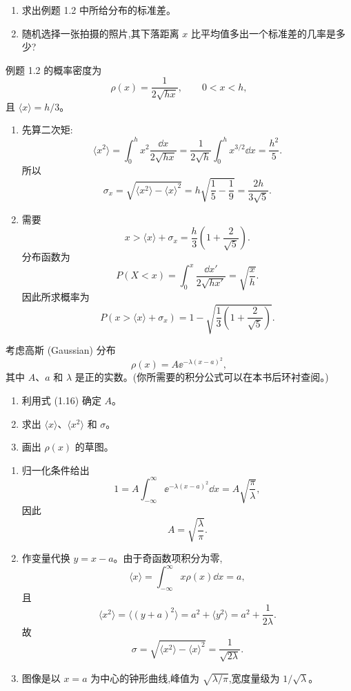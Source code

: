 \begin{question}
\begin{enumerate}
\item 求出例题 1.2 中所给分布的标准差。
\item 随机选择一张拍摄的照片,其下落距离 $x$ 比平均值多出一个标准差的几率是多少?
\end{enumerate}
\end{question}
\begin{solution}
例题 1.2 的概率密度为
\[
\rho(x)=\frac{1}{2\sqrt{hx}},\qquad 0<x<h,
\]
且 $\langle x\rangle=h/3$。
\begin{enumerate}
\item 先算二次矩:
\[
\langle x^2\rangle=\int_0^h x^2\frac{\dd x}{2\sqrt{hx}}
=\frac{1}{2\sqrt h}\int_0^h x^{3/2}\dd x
=\frac{h^2}{5}.
\]
所以
\[
\sigma_x=\sqrt{\langle x^2\rangle-\langle x\rangle^2}
=h\sqrt{\frac15-\frac19}=\frac{2h}{3\sqrt5}.
\]
\item 需要
\[
x>\langle x\rangle+\sigma_x=\frac{h}{3}\left(1+\frac{2}{\sqrt5}\right).
\]
分布函数为
\[
P(X<x)=\int_0^x \frac{\dd x'}{2\sqrt{hx'}}=\sqrt{\frac{x}{h}}.
\]
因此所求概率为
\[
P\left(x>\langle x\rangle+\sigma_x\right)
=1-\sqrt{\frac13\left(1+\frac{2}{\sqrt5}\right)}.
\]
\end{enumerate}
\end{solution}

\begin{question}
考虑高斯 (Gaussian) 分布
\[
\rho(x)=A \ee^{-\lambda (x-a)^2},
\]
其中 $A$、$a$ 和 $\lambda$ 是正的实数。(你所需要的积分公式可以在本书后环衬查阅。)
\begin{enumerate}
\item 利用式 (1.16) 确定 $A$。
\item 求出 $\langle x\rangle$、$\langle x^2\rangle$ 和 $\sigma$。
\item 画出 $\rho(x)$ 的草图。
\end{enumerate}

\par\smallskip
{}

\end{question}
\begin{solution}
\begin{enumerate}
\item 归一化条件给出
\[
1=A\int_{-\infty}^{\infty}\ee^{-\lambda(x-a)^2}\dd x
=A\sqrt{\frac{\pi}{\lambda}},
\]
因此
\[
A=\sqrt{\frac{\lambda}{\pi}}.
\]
\item 作变量代换 $y=x-a$。由于奇函数项积分为零,
\[
\langle x\rangle=\int_{-\infty}^{\infty}x\rho(x)\dd x=a,
\]
且
\[
\langle x^2\rangle=\langle (y+a)^2\rangle
=a^2+\langle y^2\rangle
=a^2+\frac{1}{2\lambda}.
\]
故
\[
\sigma=\sqrt{\langle x^2\rangle-\langle x\rangle^2}=\frac{1}{\sqrt{2\lambda}}.
\]
\item 图像是以 $x=a$ 为中心的钟形曲线,峰值为 $\sqrt{\lambda/\pi}$,宽度量级为 $1/\sqrt{\lambda}$。
\end{enumerate}
\end{solution}

